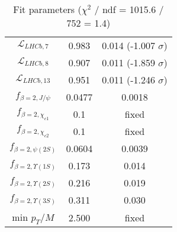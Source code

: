 \begin{table}[h!]
\begin{tabular}{c|c|c}
$\mathcal L_{LHCb,7}$ & 0.983 & 0.014 (-1.007 $\sigma$) \\
$\mathcal L_{LHCb,8}$ & 0.907 & 0.011 (-1.859 $\sigma$) \\
$\mathcal L_{LHCb,13}$ & 0.951 & 0.011 (-1.246 $\sigma$) \\
$f_{\beta=2,J/\psi}$ & 0.0477 & 0.0018 \\
$f_{\beta=2,\chi_{c1}}$ & 0.1 & fixed \\
$f_{\beta=2,\chi_{c2}}$ & 0.1 & fixed \\
$f_{\beta=2,\psi(2S)}$ & 0.0604 & 0.0039 \\
$f_{\beta=2,\Upsilon(1S)}$ & 0.173 & 0.014 \\
$f_{\beta=2,\Upsilon(2S)}$ & 0.216 & 0.019 \\
$f_{\beta=2,\Upsilon(3S)}$ & 0.311 & 0.030 \\
min $p_T/M$ & 2.500 & fixed \\
\end{tabular}
\caption{Fit parameters ($\chi^2$ / ndf = 1015.6 / 752 = 1.4)}
\end{table}
